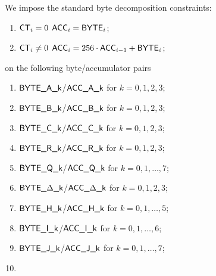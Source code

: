 We impose the standard byte decomposition constraints:
\begin{enumerate}
	\item \If $\textsf{CT}_{i} = 0$ \Then $\textsf{ACC}_{i} = \textsf{BYTE}_{i}$;
	\item \If $\textsf{CT}_{i} \neq 0$ \Then $\textsf{ACC}_{i} = 256 \cdot \textsf{ACC}_{i - 1} + \textsf{BYTE}_{i}$;
\end{enumerate}
on the following byte/accumulator pairs
\begin{multicols}{2}
\begin{enumerate}
	\item $\textsf{BYTE}\textsf{\_A\_k}$/$\textsf{ACC}\textsf{\_A\_k}$               for $k=0,1,2,3$;
	\item $\textsf{BYTE}\textsf{\_B\_k}$/$\textsf{ACC}\textsf{\_B\_k}$               for $k=0,1,2,3$;
	\item $\textsf{BYTE}\textsf{\_C\_k}$/$\textsf{ACC}\textsf{\_C\_k}$               for $k=0,1,2,3$;
	\item $\textsf{BYTE}\textsf{\_R\_k}$/$\textsf{ACC}\textsf{\_R\_k}$               for $k=0,1,2,3$;
	\item $\textsf{BYTE}\textsf{\_Q\_k}$/$\textsf{ACC}\textsf{\_Q\_k}$               for $k=0,1,\dots,7$;
	\item $\textsf{BYTE}\textsf{\_$\Delta$\_k}$/$\textsf{ACC}\textsf{\_$\Delta$\_k}$ for $k=0,1,2,3$;
	\item $\textsf{BYTE}\textsf{\_H\_k}$/$\textsf{ACC}\textsf{\_H\_k}$               for $k=0,1,\dots,5$;
	\item $\textsf{BYTE}\textsf{\_I\_k}$/$\textsf{ACC}\textsf{\_I\_k}$               for $k=0,1,\dots,6$;
	\item $\textsf{BYTE}\textsf{\_J\_k}$/$\textsf{ACC}\textsf{\_J\_k}$               for $k=0,1,\dots,7$;
	\item[\vspace{\fill}]
\end{enumerate}
\end{multicols}
